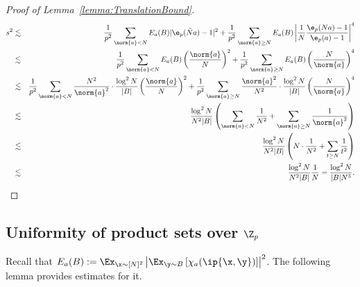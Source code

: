 \begin{proof}[Proof of Lemma~\ref{lemma:TranslationBound}]
\begin{eqnarray*}
	 s^2 & \lesssim &\frac{1}{p^2} \sum_{\norm{a} < N} E_a(B)  |\e_p(\tilde{N}a)-1|^2  + \frac{1}{p^2}\sum_{\norm{a} \ge N}    E_a(B)  \left|\frac{1}{N} \frac{\e_p(Na)-1}{\e_p(a)-1}\right|^4 \\
& \lesssim &\frac{1}{p^2} \sum_{\norm{a} < N}  E_a(B) \left(\frac{\norm{a}}{N} \right)^2  + \frac{1}{p^2}\sum_{\norm{a} \ge N}     E_a(B) \left(\frac{N}{\norm{a}} \right)^4  \\
&\lesssim& \frac{1}{p^2} \sum_{\norm{a} < N}  \frac{N^2}{\norm{a}^2} \cdot \frac{\log^2 N}{|B|}   \left(\frac{ \norm{a}}{N} \right)^2 +  \frac{1}{p^2} \sum_{\norm{a} \ge N}  \frac{\norm{a}^2}{N^2} \cdot \frac{\log^2 N}{|B|}  \left(\frac{N}{ \norm{a}} \right)^4   \\
	 &\lesssim&\frac{\log^2 N }{N^2|B|}  \left( \sum_{\norm{a} < N}  \frac{1}{N^2} +  \sum_{\norm{a} \ge N}   \frac{ 1}{\norm{a}^2} \right) \\
	 &\lesssim&\frac{\log^2 N }{N^2|B|}  \left( N \cdot  \frac{1}{N^2} +  \sum_{t \ge N}  \frac{1 }{t^2} \right) \\
&\lesssim & \frac{\log^2 N}{N^2|B|} \frac{1}{N} = \frac{ \log^2 N}{|B|N^3}.
\end{eqnarray*}
 \end{proof}

\subsection{Uniformity of product sets over $\Z_p$}
Recall that $ E_a(B) :=   \Ex_{\x \sim [N]^2}  \left|\Ex_{\y \sim B}   \left[ \chi_a(\ip{\x,\y})\right]\right|^2$. The following
lemma provides estimates for it.

